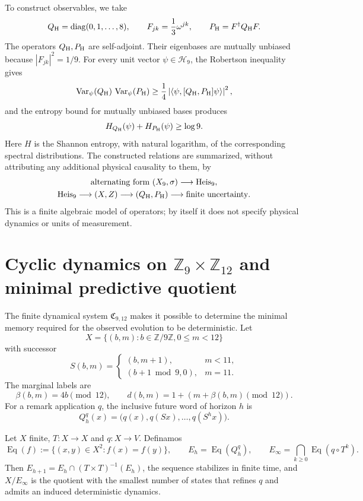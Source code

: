 To construct observables, we take
\[
Q_{\rm H}=\operatorname{diag}(0,1,\ldots,8),
\qquad
F_{jk}=\frac13\omega^{jk},
\qquad
P_{\rm H}=F^\dagger Q_{\rm H}F.
\]
The operators \(Q_{\rm H},P_{\rm H}\) are self-adjoint. Their eigenbases are mutually
unbiased because \(|F_{jk}|^2=1/9\). For every unit vector
\(\psi\in\mathcal H_9\), the Robertson inequality gives
\[
\operatorname{Var}_\psi(Q_{\rm H})\,
\operatorname{Var}_\psi(P_{\rm H})
\ge
\frac14\left|\langle\psi,[Q_{\rm H},P_{\rm H}]\psi\rangle\right|^2,
\]
and the entropy bound for mutually unbiased bases produces
\[
H_{Q_{\rm H}}(\psi)+H_{P_{\rm H}}(\psi)\ge\log9.
\]
Here \(H\) is the Shannon entropy, with natural logarithm, of the
corresponding spectral distributions. The constructed relations are
summarized, without attributing any additional physical causality to them, by
\[
\begin{gathered}
\text{alternating form }(X_9,\sigma)
\longrightarrow
\operatorname{Heis}_9,\\
\operatorname{Heis}_9\longrightarrow(X,Z)
\longrightarrow(Q_{\rm H},P_{\rm H})
\longrightarrow\text{finite uncertainty}.
\end{gathered}
\]
This is a finite algebraic model of operators; by itself it does not specify
physical dynamics or units of measurement.

\section{Cyclic dynamics on \texorpdfstring{\(\mathbb Z_9\times\mathbb Z_{12}\)}{Z9 x Z12} and minimal predictive quotient}

The finite dynamical system \(\mathfrak C_{9,12}\) makes it possible to determine the minimal
memory required for the observed evolution to be deterministic. Let
\[
X=\{(b,m):b\in\mathbb Z/9\mathbb Z, 0\le m<12\}
\]
with successor
\[
S(b,m)=
\begin{cases}
(b,m+1),&m<11,\\
(b+1\bmod9,0),&m=11.
\end{cases}
\]
The marginal labels are
\[
\beta(b,m)=4b\pmod{12},
\qquad
d(b,m)=1+(m+\beta(b,m)\pmod{12}).
\]
For a remark application \(q\), the inclusive future word of horizon \(h\) is
\[
Q_h^q(x)=\bigl(q(x),q(Sx),\ldots,q(S^hx)\bigr).
\]

\begin{theorem}
Let \(X\) finite, \(T:X\to X\) and \(q:X\to V\). Definamos
\[
\operatorname{Eq}(f):=\{(x,y)\in X^2:f(x)=f(y)\},
\qquad
E_h=\operatorname{Eq}(Q_h^q),
\qquad
E_\infty=\bigcap_{k\ge0}\operatorname{Eq}(q\circ T^k).
\]
Then
\(E_{h+1}=E_h\cap(T\times T)^{-1}(E_h)\), the sequence stabilizes in finite
time, and \(X/E_\infty\) is the quotient with the smallest number of states that
refines \(q\) and admits an induced deterministic dynamics.
\end{theorem}


